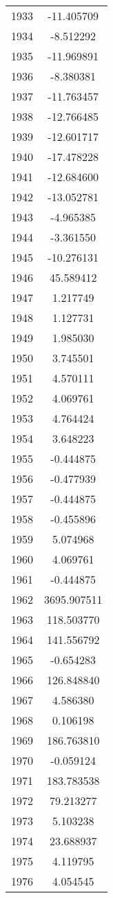 \documentclass[12pt]{article}
\begin{document}
\begin{longtable}{@{}cc@{}}
1933 & -11.405709 \\
1934 & -8.512292 \\
1935 & -11.969891 \\
1936 & -8.380381 \\
1937 & -11.763457 \\
1938 & -12.766485 \\
1939 & -12.601717 \\
1940 & -17.478228 \\
1941 & -12.684600 \\
1942 & -13.052781 \\
1943 & -4.965385 \\
1944 & -3.361550 \\
1945 & -10.276131 \\
1946 & 45.589412 \\
1947 & 1.217749 \\
1948 & 1.127731 \\
1949 & 1.985030 \\
1950 & 3.745501 \\
1951 & 4.570111 \\
1952 & 4.069761 \\
1953 & 4.764424 \\
1954 & 3.648223 \\
1955 & -0.444875 \\
1956 & -0.477939 \\
1957 & -0.444875 \\
1958 & -0.455896 \\
1959 & 5.074968 \\
1960 & 4.069761 \\
1961 & -0.444875 \\
1962 & 3695.907511 \\
1963 & 118.503770 \\
1964 & 141.556792 \\
1965 & -0.654283 \\
1966 & 126.848840 \\
1967 & 4.586380 \\
1968 & 0.106198 \\
1969 & 186.763810 \\
1970 & -0.059124 \\
1971 & 183.783538 \\
1972 & 79.213277 \\
1973 & 5.103238 \\
1974 & 23.688937 \\
1975 & 4.119795 \\
1976 & 4.054545 \\

\end{longtable}
\end{document}
